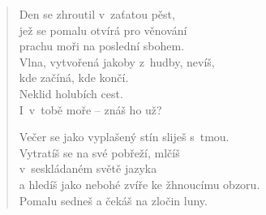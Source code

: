 \begin{verse}
\medskip

Den se zhroutil v zaťatou pěst, \\
jež se pomalu otvírá pro věnování \\
prachu moři na poslední sbohem. \\
Vlna, vytvořená jakoby z hudby, nevíš, \\
kde začíná, kde končí. \\
Neklid holubích cest. \\
I~v tobě moře -- znáš ho už? \\

\medskip

Večer se jako vyplašený stín sliješ s tmou. \\
Vytratíš se na své pobřeží, mlčíš \\
v seskládaném světě jazyka \\
a hledíš jako nebohé zvíře ke žhnoucímu obzoru. \\
Pomalu sedneš a čekáš na zločin luny. \\

\end{verse}

